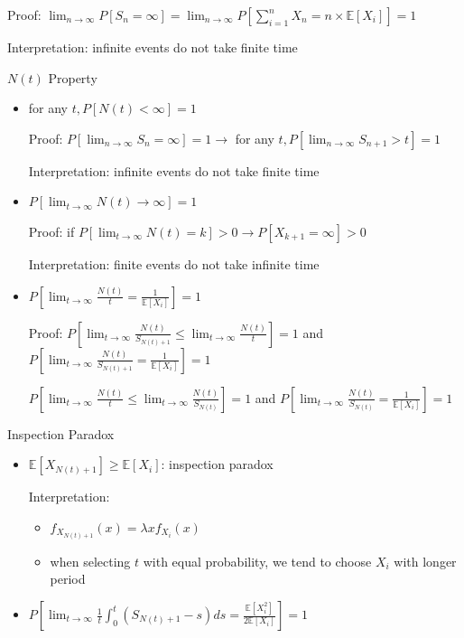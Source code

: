 \documentclass[a4paper]{article}
\begin{document}
\begin{itemize}
\begin{itemize}
\begin{itemize}
                        Proof: $\lim_{n \rightarrow \infty} P[S_n = \infty] = \lim_{n \rightarrow \infty} P[\sum_{i = 1}^n X_n = n \times \mathbb{E}[X_i]] = 1$

                        Interpretation: infinite events do not take finite time
                \end{itemize}
                $N(t)$ Property
                \begin{itemize}
                    \item for any $t, P[N(t) < \infty] = 1$

                        Proof: $P[\lim_{n \rightarrow \infty} S_n = \infty] = 1 \rightarrow$ for any $t, P[\lim_{n \rightarrow \infty} S_{n+1} > t] = 1$

                        Interpretation: infinite events do not take finite time
                    \item $P[\lim_{t \rightarrow \infty} N(t) \rightarrow \infty] = 1$

                        Proof: if $P[\lim_{t \rightarrow \infty} N(t) = k] > 0 \rightarrow P[X_{k+1} = \infty] > 0$

                        Interpretation: finite events do not take infinite time
                    \item $P[\lim_{t \rightarrow \infty} \frac{N(t)}{t} = \frac{1}{\mathbb{E}[X_i]}] = 1$

                        Proof: $P[\lim_{t \rightarrow \infty} \frac{N(t)}{S_{N(t) + 1}} \leq \lim_{t \rightarrow \infty} \frac{N(t)}{t}] = 1$ and $P[\lim_{t \rightarrow \infty} \frac{N(t)}{S_{N(t) + 1}} = \frac{1}{\mathbb{E}[X_i]}] = 1$

                        $P[\lim_{t \rightarrow \infty} \frac{N(t)}{t} \leq \lim_{t \rightarrow \infty} \frac{N(t)}{S_{N(t)}}] = 1$ and $P[\lim_{t \rightarrow \infty} \frac{N(t)}{S_{N(t)}} = \frac{1}{\mathbb{E}[X_i]}] = 1$
                \end{itemize}
                Inspection Paradox
                \begin{itemize}
                    \item $\mathbb{E}[X_{N(t) + 1}] \geq \mathbb{E}[X_i]$: inspection paradox

                        Interpretation:
                        \begin{itemize}
                            \item $f_{X_{N(t)+1}}(x) = \lambda x f_{X_i}(x)$
                            \item when selecting $t$ with equal probability, we tend to choose $X_i$ with longer period
                        \end{itemize}
                    \item $P[\lim_{t \rightarrow \infty} \frac{1}{t} \int_0^t (S_{N(t) + 1} - s) ds = \frac{\mathbb{E}[X_i^2]}{2\mathbb{E}[X_i]}] = 1$


\end{itemize}
\end{itemize}
\end{itemize}
\end{document}
